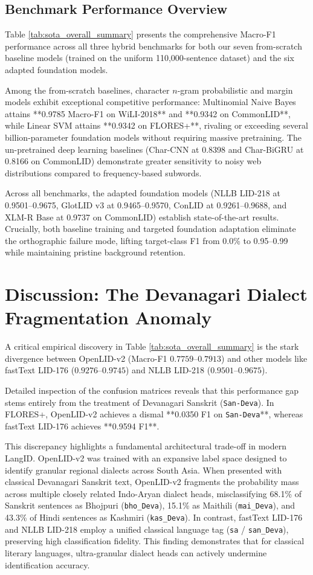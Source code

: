 \documentclass[11pt]{article}
\begin{document}
\subsection{Benchmark Performance Overview}
Table \ref{tab:sota_overall_summary} presents the comprehensive Macro-F1 performance across all three hybrid benchmarks for both our seven from-scratch baseline models (trained on the uniform 110,000-sentence dataset) and the six adapted foundation models. 

Among the from-scratch baselines, character $n$-gram probabilistic and margin models exhibit exceptional competitive performance: Multinomial Naive Bayes attains **0.9785 Macro-F1 on WiLI-2018** and **0.9342 on CommonLID**, while Linear SVM attains **0.9342 on FLORES+**, rivaling or exceeding several billion-parameter foundation models without requiring massive pretraining. The un-pretrained deep learning baselines (Char-CNN at 0.8398 and Char-BiGRU at 0.8166 on CommonLID) demonstrate greater sensitivity to noisy web distributions compared to frequency-based subwords.

Across all benchmarks, the adapted foundation models (NLLB LID-218 at 0.9501--0.9675, GlotLID v3 at 0.9465--0.9570, ConLID at 0.9261--0.9688, and XLM-R Base at 0.9737 on CommonLID) establish state-of-the-art results. Crucially, both baseline training and targeted foundation adaptation eliminate the orthographic failure mode, lifting target-class F1 from 0.0\% to 0.95--0.99 while maintaining pristine background retention.

\section{Discussion: The Devanagari Dialect Fragmentation Anomaly}

A critical empirical discovery in Table \ref{tab:sota_overall_summary} is the stark divergence between OpenLID-v2 (Macro-F1 $0.7759$--$0.7913$) and other models like fastText LID-176 ($0.9276$--$0.9745$) and NLLB LID-218 ($0.9501$--$0.9675$).

Detailed inspection of the confusion matrices reveals that this performance gap stems entirely from the treatment of Devanagari Sanskrit (\texttt{San-Deva}). In FLORES+, OpenLID-v2 achieves a dismal **0.0350 F1 on \texttt{San-Deva}**, whereas fastText LID-176 achieves **0.9594 F1**.

This discrepancy highlights a fundamental architectural trade-off in modern LangID. OpenLID-v2 was trained with an expansive label space designed to identify granular regional dialects across South Asia. When presented with classical Devanagari Sanskrit text, OpenLID-v2 fragments the probability mass across multiple closely related Indo-Aryan dialect heads, misclassifying 68.1\% of Sanskrit sentences as Bhojpuri (\texttt{bho\_Deva}), 15.1\% as Maithili (\texttt{mai\_Deva}), and 43.3\% of Hindi sentences as Kashmiri (\texttt{kas\_Deva}). In contrast, fastText LID-176 and NLLB LID-218 employ a unified classical language tag (\texttt{sa} / \texttt{san\_Deva}), preserving high classification fidelity. This finding demonstrates that for classical literary languages, ultra-granular dialect heads can actively undermine identification accuracy.
\end{document}
